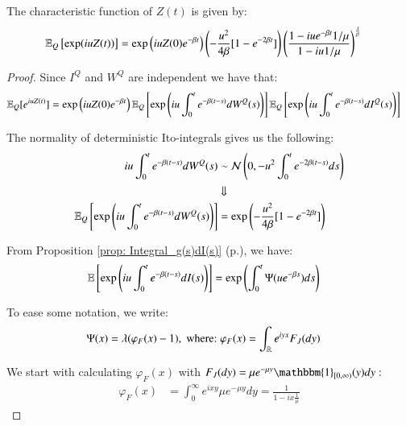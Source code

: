 \newpage 

\begin{proposition}
\label{prop: Characteristic_function_ESG_risk_score}
The characteristic function of $Z(t)$ is given by:
\begin{align*}
\mathbb{E}_{Q}\left[
\exp(iu Z(t))
\right] 
&= 
\exp\left(
iuZ(0)e^{-\beta t}\right)
\left(
-\frac{u^{2}}{4\beta}[1-e^{-2\beta t}]
\right)
\left(
\frac{
1-iue^{-\beta t}1/\mu}
{
1-iu1/\mu
}
\right)^{\frac{\lambda}{\beta}}    
\end{align*}
\end{proposition}

\begin{proof}
Since $I^{Q}$ and $W^{Q}$ are independent we have that: 
\begin{align*}
\mathbb{E}_{Q}[e^{iuZ(t)}]
&= 
\exp\left(
iuZ(0)e^{-\beta t}
\right)
\mathbb{E}_{Q}\left[
\exp\left(
iu\int_{0}^{t}e^{-\beta(t-s)}dW^{Q}(s)
\right)
\right]
\mathbb{E}_{Q}\left[
\exp\left(
iu\int_{0}^{t}e^{-\beta(t-s)}dI^{Q}(s)
\right)
\right]
\end{align*}

The normality of deterministic Ito-integrals gives us the following:
\begin{align*}
iu\int_{0}^{t}e^{-\beta(t-s)}dW^{Q}(s) &\sim \mathcal{N}\left(
0, -u^{2}\int_{0}^{t}e^{-2\beta(t-s)}ds
\right) \\ 
&\Downarrow \\ 
\mathbb{E}_{Q}\left[
\exp\left(
iu\int_{0}^{t}e^{-\beta(t-s)}dW^{Q}(s)
\right)
\right]
&= 
\exp\left(
-\frac{u^{2}}{4\beta}[1-e^{-2\beta t}]
\right)
\end{align*}

From Proposition \ref{prop: Integral_g(s)dI(s)} (p.\pageref{prop: Integral_g(s)dI(s)}), we have: 
\begin{align*}
\mathbb{E}\left[
\exp\left(iu\int_{0}^{t}e^{-\beta(t-s)}dI(s)\right)
\right] 
&= 
\exp\left(
\int_{0}^{t}\Psi(ue^{-\beta s})ds
\right)
\end{align*}

To ease some notation, we write:
\begin{align*}
\Psi(x) &= \lambda(\varphi_{F}(x) - 1), \;\text{where:}\; 
\varphi_{F}(x) = \int_{\mathbb{R}}e^{iyx}F_{J}(dy) 
\end{align*}

We start with calculating $\varphi_{F}(x)$ with $F_{J}(dy) = 
\mu e^{-\mu y}\mathbbm{1}_{[0,\infty)}(y)dy:$ 
\begin{align*}
\varphi_{F}(x) &= 
\int_{0}^{\infty}e^{ixy}\mu e^{-\mu y}dy   
= \frac{1}{1-ix\frac{1}{\mu}}
\end{align*}


\end{proof}
